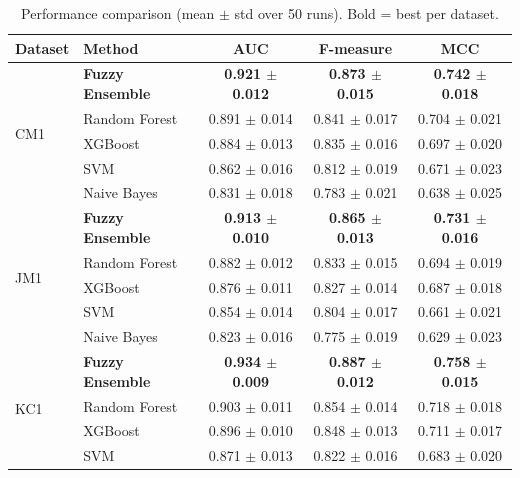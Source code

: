\documentclass[10pt,twocolumn]{article}
\begin{document}
\begin{table}[ht]
  \centering
  \caption{Performance comparison (mean $\pm$ std over 50 runs). Bold = best per dataset.}
  \label{tab:results_auc}
  \small
  \begin{tabular}{ll ccc}
    \toprule
    \textbf{Dataset} & \textbf{Method} & \textbf{AUC} & \textbf{F-measure} & \textbf{MCC} \\
    \midrule
    \multirow{5}{*}{CM1}
      & \textbf{Fuzzy Ensemble} & \textbf{0.921 $\pm$ 0.012} & \textbf{0.873 $\pm$ 0.015} & \textbf{0.742 $\pm$ 0.018} \\
      & Random Forest           & 0.891 $\pm$ 0.014          & 0.841 $\pm$ 0.017          & 0.704 $\pm$ 0.021 \\
      & XGBoost                 & 0.884 $\pm$ 0.013          & 0.835 $\pm$ 0.016          & 0.697 $\pm$ 0.020 \\
      & SVM                     & 0.862 $\pm$ 0.016          & 0.812 $\pm$ 0.019          & 0.671 $\pm$ 0.023 \\
      & Naive Bayes             & 0.831 $\pm$ 0.018          & 0.783 $\pm$ 0.021          & 0.638 $\pm$ 0.025 \\
    \midrule
    \multirow{5}{*}{JM1}
      & \textbf{Fuzzy Ensemble} & \textbf{0.913 $\pm$ 0.010} & \textbf{0.865 $\pm$ 0.013} & \textbf{0.731 $\pm$ 0.016} \\
      & Random Forest           & 0.882 $\pm$ 0.012          & 0.833 $\pm$ 0.015          & 0.694 $\pm$ 0.019 \\
      & XGBoost                 & 0.876 $\pm$ 0.011          & 0.827 $\pm$ 0.014          & 0.687 $\pm$ 0.018 \\
      & SVM                     & 0.854 $\pm$ 0.014          & 0.804 $\pm$ 0.017          & 0.661 $\pm$ 0.021 \\
      & Naive Bayes             & 0.823 $\pm$ 0.016          & 0.775 $\pm$ 0.019          & 0.629 $\pm$ 0.023 \\
    \midrule
    \multirow{5}{*}{KC1}
      & \textbf{Fuzzy Ensemble} & \textbf{0.934 $\pm$ 0.009} & \textbf{0.887 $\pm$ 0.012} & \textbf{0.758 $\pm$ 0.015} \\
      & Random Forest           & 0.903 $\pm$ 0.011          & 0.854 $\pm$ 0.014          & 0.718 $\pm$ 0.018 \\
      & XGBoost                 & 0.896 $\pm$ 0.010          & 0.848 $\pm$ 0.013          & 0.711 $\pm$ 0.017 \\
      & SVM                     & 0.871 $\pm$ 0.013          & 0.822 $\pm$ 0.016          & 0.683 $\pm$ 0.020 \\

\end{tabular}
\end{table}
\end{document}
